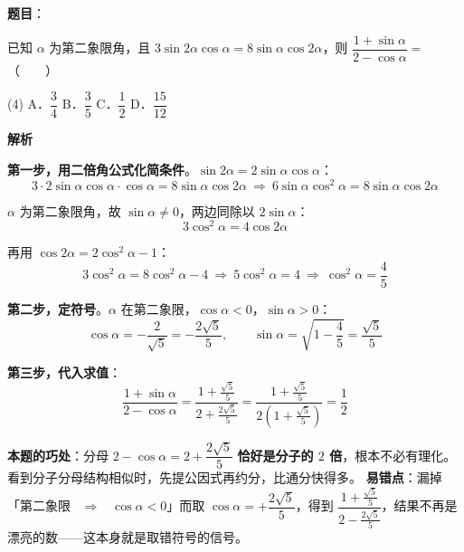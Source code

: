\begin{answer}

\textbf{题目}：

已知 $\alpha$ 为第二象限角，且 $3\sin2\alpha\cos\alpha=8\sin\alpha\cos2\alpha$，则 $\dfrac{1+\sin\alpha}{2-\cos\alpha}=$\mbox{（　　）}

\begin{gkopts}(4)
\task A．$\dfrac{3}{4}$
\task B．$\dfrac{3}{5}$
\task C．$\dfrac{1}{2}$
\task D．$\dfrac{15}{12}$
\end{gkopts}

\textbf{解析}

\textbf{第一步，用二倍角公式化简条件}。$\sin2\alpha=2\sin\alpha\cos\alpha$：
\nopagebreak[4]
\[3\cdot2\sin\alpha\cos\alpha\cdot\cos\alpha=8\sin\alpha\cos2\alpha\ \Longrightarrow\ 6\sin\alpha\cos^2\alpha=8\sin\alpha\cos2\alpha\]

$\alpha$ 为第二象限角，故 $\sin\alpha\ne0$，两边同除以 $2\sin\alpha$：
\nopagebreak[4]
\[3\cos^2\alpha=4\cos2\alpha\]

再用 $\cos2\alpha=2\cos^2\alpha-1$：
\nopagebreak[4]
\[3\cos^2\alpha=8\cos^2\alpha-4\ \Longrightarrow\ 5\cos^2\alpha=4\ \Longrightarrow\ \cos^2\alpha=\frac45\]

\textbf{第二步，定符号}。$\alpha$ 在第二象限，$\cos\alpha<0$，$\sin\alpha>0$：
\nopagebreak[4]
\[\cos\alpha=-\frac{2}{\sqrt5}=-\frac{2\sqrt5}{5},\qquad \sin\alpha=\sqrt{1-\frac45}=\frac{\sqrt5}{5}\]

\textbf{第三步，代入求值}：
\nopagebreak[4]
\[\frac{1+\sin\alpha}{2-\cos\alpha}=\frac{1+\frac{\sqrt5}{5}}{2+\frac{2\sqrt5}{5}}=\frac{1+\frac{\sqrt5}{5}}{2\left(1+\frac{\sqrt5}{5}\right)}=\frac12\]

\begin{gktip}
\textbf{本题的巧处}：分母 $2-\cos\alpha=2+\dfrac{2\sqrt5}{5}$ \textbf{恰好是分子的 $2$ 倍}，根本不必有理化。看到分子分母结构相似时，先提公因式再约分，比通分快得多。
\textbf{易错点}：漏掉「第二象限 ~$\Longrightarrow$~ $\cos\alpha<0$」而取 $\cos\alpha=+\dfrac{2\sqrt5}{5}$，得到 $\dfrac{1+\frac{\sqrt5}{5}}{2-\frac{2\sqrt5}{5}}$，结果不再是漂亮的数——这本身就是取错符号的信号。
\end{gktip}


\par\medskip

\end{answer}
